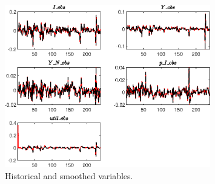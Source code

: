  
\begin{figure}[H]
\centering 
\includegraphics[width=0.80\textwidth]{BRS_imp_mobility_est/graphs/BRS_imp_mobility_est_HistoricalAndSmoothedVariables1}
\caption{Historical and smoothed variables.}\label{Fig:HistoricalAndSmoothedVariables:1}
\end{figure}


